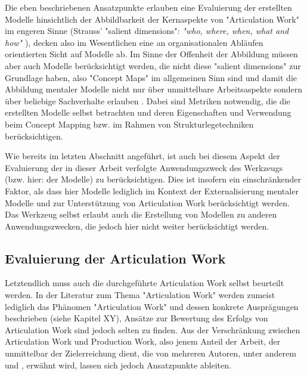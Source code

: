Die eben beschriebenen Ansatzpunkte erlauben eine Evaluierung der erstellten Modelle hinsichtlich der Abbildbarkeit der Kernaspekte von "Articulation Work" im engeren Sinne (Strauss' "salient dimensions": \emph{"who, where, when, what and how"} \citep{Fjuk97}), decken also im Wesentlichen eine an organisationalen Abläufen orientierten Sicht auf Modelle ab. Im Sinne der Offenheit der Abbildung müssen aber auch Modelle berücksichtigt werden, die nicht diese "salient dimensions" zur Grundlage haben, also "Concept Maps" \citep{Novak06} im allgemeinen Sinn sind und damit die Abbildung mentaler Modelle nicht nur über unmittelbare Arbeitsaspekte sondern über beliebige Sachverhalte erlauben \citep{Ifenthaler06}. Dabei sind Metriken notwendig, die die erstellten Modelle selbst betrachten und deren Eigenschaften und Verwendung beim Concept Mapping bzw. im Rahmen von Strukturlegetechniken berücksichtigen.

Wie bereits im letzten Abschnitt angeführt, ist auch bei diesem Aspekt der Evaluierung der in dieser Arbeit verfolgte Anwendungszweck des Werkzeugs (bzw. hier: der Modelle) zu berücksichtigen. Dies ist insofern ein einschränkender Faktor, als dass hier Modelle lediglich im Kontext der Externalisierung mentaler Modelle und zur Unterstützung von Articulation Work berücksichtigt werden. Das Werkzeug selbst erlaubt auch die Erstellung von Modellen zu anderen Anwendungszwecken, die jedoch hier nicht weiter berücksichtigt werden.  

\subsection{Evaluierung der Articulation Work}
\label{sub:eval_articulation_work}

Letztendlich muss auch die durchgeführte Articulation Work selbst beurteilt werden. In der Literatur zum Thema "Articulation Work" werden zumeist lediglich das Phänomen "Articulation Work" und dessen konkrete Ausprägungen beschrieben (siehe Kapitel XY), Ansätze zur Bewertung des Erfolgs von Articulation Work sind jedoch selten zu finden. Aus der Verschränkung zwischen Articulation Work und Production Work, also jenem Anteil der Arbeit, der unmittelbar der Zielerreichung dient, die von mehreren Autoren, unter anderem \citep{Fujimura87} und \citep{Strauss93}, erwähnt wird, lassen sich jedoch Ansatzpunkte ableiten.

